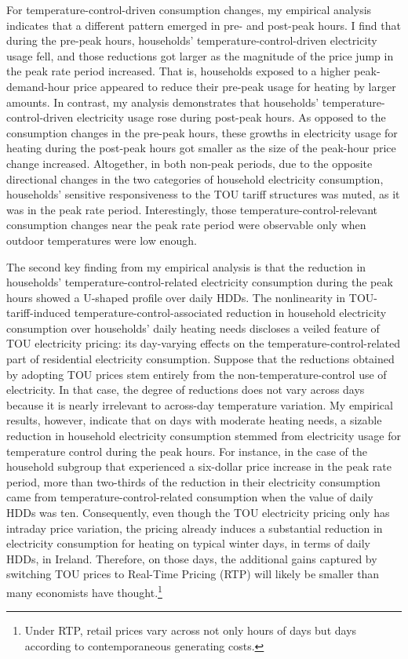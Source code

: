For temperature-control-driven consumption changes, my empirical analysis indicates that a different pattern emerged in pre- and post-peak hours. I find that during the pre-peak hours, households' temperature-control-driven electricity usage fell, and those reductions got larger as the magnitude of the price jump in the peak rate period increased. That is, households exposed to a higher peak-demand-hour price appeared to reduce their pre-peak usage for heating by larger amounts. In contrast, my analysis demonstrates that households' temperature-control-driven electricity usage rose during post-peak hours. As opposed to the consumption changes in the pre-peak hours, these growths in electricity usage for heating during the post-peak hours got smaller as the size of the peak-hour price change increased. Altogether, in both non-peak periods, due to the opposite directional changes in the two categories of household electricity consumption, households' sensitive responsiveness to the TOU tariff structures was muted, as it was in the peak rate period. Interestingly, those temperature-control-relevant consumption changes near the peak rate period were observable only when outdoor temperatures were low enough. 

The second key finding from my empirical analysis is that the reduction in households' temperature-control-related electricity consumption during the peak hours showed a U-shaped profile over daily HDDs. The nonlinearity in TOU-tariff-induced temperature-control-associated reduction in household electricity consumption over households' daily heating needs discloses a veiled feature of TOU electricity pricing: its day-varying effects on the temperature-control-related part of residential electricity consumption. Suppose that the reductions obtained by adopting TOU prices stem entirely from the non-temperature-control use of electricity. In that case, the degree of reductions does not vary across days because it is nearly irrelevant to across-day temperature variation. My empirical results, however, indicate that on days with moderate heating needs, a sizable reduction in household electricity consumption stemmed from electricity usage for temperature control during the peak hours. For instance, in the case of the household subgroup that experienced a six-dollar price increase in the peak rate period, more than two-thirds of the reduction in their electricity consumption came from temperature-control-related consumption when the value of daily HDDs was ten. Consequently, even though the TOU electricity pricing only has intraday price variation, the pricing already induces a substantial reduction in electricity consumption for heating on typical winter days, in terms of daily HDDs, in Ireland. Therefore, on those days, the additional gains captured by switching TOU prices to Real-Time Pricing (RTP) will likely be smaller than many economists have thought.\footnote{Under RTP, retail prices vary across not only hours of days but days according to contemporaneous generating costs.} 


